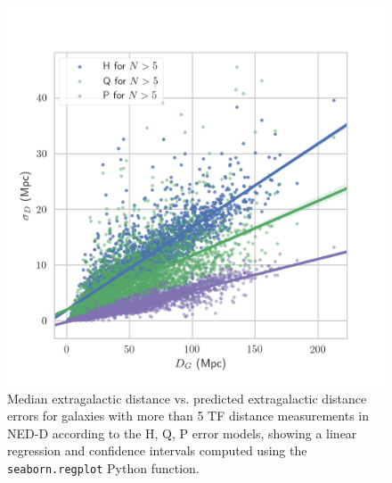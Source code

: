 \documentclass[a4paper,fleqn,usenatbib]{mnras}
\begin{document}
\begin{figure}

	\includegraphics[scale=0.7]{hqp.png}
    \caption{Median extragalactic distance vs. predicted extragalactic distance errors for galaxies with more than 5 TF distance measurements in NED-D according to the H, Q, P error models, showing a linear regression and confidence intervals computed using the \texttt{seaborn.regplot} Python function.}
    \label{fig:hqp}
\end{figure}
\end{document}
